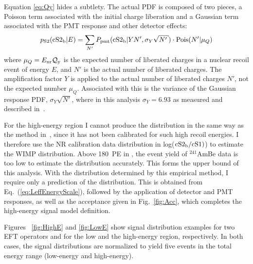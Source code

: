 Equation \ref{eq:Qy} hides a subtlety. The actual \cSiib{} PDF is composed of two pieces, a Poisson term associated with the initial charge liberation and a Gaussian term associated with the PMT response and other detector effects:
%
\begin{equation}
\label{eq.cS2pdf}
p_\mathrm{S2}(\mathrm{\cSiib}|E) = \sum_{N'} P_\mathrm{pmt}(\mathrm{\cSiib}|Y N',\sigma_Y \sqrt{N'})\cdot\mathrm{Pois}(N'|\mu_Q)
\end{equation}
%
where $\mu_Q=E_{\mathrm{nr}}\mathcal{Q}_{\mathrm{y}}$ is the expected number of liberated charges in a nuclear recoil event of energy $E$, and $N'$ is the actual number of liberated charges. The amplification factor $Y$ is applied to the actual number of liberated charges $N'$, not the expected number $\mu_Q$. Associated with this is the variance of the Gaussian response PDF, $\sigma_Y\sqrt{N'}$, where in this analysis $\sigma_Y = 6.93$ as measured and described in~\cite{XenonSingleElectron}. 

For the high-energy region I cannot produce the \Sii{} distribution in the same way as the method in~\cite{DataMCXenon}, since it  has not been calibrated for such high recoil energies. I therefore use the NR calibration data distribution in log($\mathrm{\mathrm{cS2}_\mathrm{b}/\mathrm{cS1})}$) to estimate the WIMP distribution. Above 180~PE in \cSi{}, the event yield of $^{241}$AmBe data is too low to estimate the distribution accurately. This forms the upper bound of this analysis. With the \cSiib{} distribution determined by this empirical method, I require only a prediction of the \cSi{} distribution. This is obtained from Eq.~(\ref{eq:LeffEnergyScale}), followed by the application of detector and PMT responses, as well as the acceptance given in Fig.~\ref{fig:Acc}, which completes the high-energy signal model definition.

Figures ~\ref{fig:HighE} and \ref{fig:LowE} show signal distribution examples for two EFT operators and for the low and the high-energy region, respectively.
In both cases, the signal distributions are normalized to yield five events in the total energy range (low-energy and high-energy).

